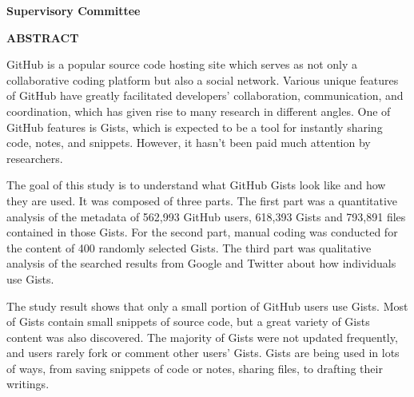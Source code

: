 \newpage
{}

\noindent \textbf{Supervisory Committee}
\tpbreak
\panel

\begin{center}
\textbf{ABSTRACT}
\end{center}

GitHub is a popular source code hosting site which serves as not only a collaborative coding platform but also a social network. Various unique features of GitHub have greatly facilitated developers' collaboration, communication, and coordination, which has given rise to many research in different angles. One of GitHub features is Gists, which is expected to be a tool for instantly sharing code, notes, and snippets. However, it hasn't been paid much attention by researchers. 

The goal of this study is to understand what GitHub Gists look like and how they are used. It was composed of three parts. The first part was a quantitative analysis of the metadata of 562,993 GitHub users, 618,393 Gists and 793,891 files contained in those Gists. For the second part, manual coding was conducted for the content of 400 randomly selected Gists. The third part was qualitative analysis of the searched results from Google and Twitter about how individuals use Gists. 

The study result shows that only a small portion of GitHub users use Gists. Most of Gists contain small snippets of source code, but a great variety of Gists content was also discovered. The majority of Gists were not updated frequently, and users rarely fork or comment other users' Gists. Gists are being used in lots of ways, from saving snippets of code or notes, sharing files, to drafting their writings.